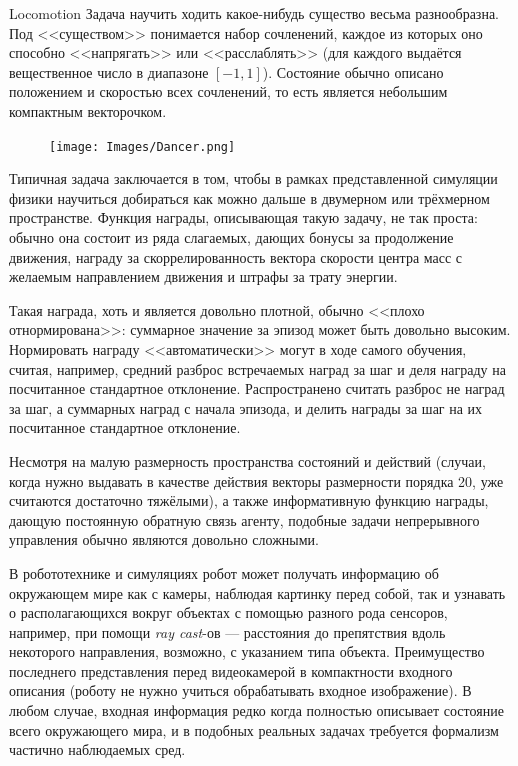 \begin{exampleBox}[label=ex:locomotion]{Locomotion}
Задача научить ходить какое-нибудь существо весьма разнообразна. Под <<существом>> понимается набор сочленений, каждое из которых оно способно <<напрягать>> или <<расслаблять>> (для каждого выдаётся вещественное число в диапазоне $[-1, 1]$). Состояние обычно описано положением и скоростью всех сочленений, то есть является небольшим компактным векторочком. 

\begin{figure}
\centering
\vspace{-0.3cm}
\texttt{[image: Images/Dancer.png]}
\vspace{-0.8cm}
\end{figure}

Типичная задача заключается в том, чтобы в рамках представленной симуляции физики научиться добираться как можно дальше в двумерном или трёхмерном пространстве. Функция награды, описывающая такую задачу, не так проста: обычно она состоит из ряда слагаемых, дающих бонусы за продолжение движения, награду за скоррелированность вектора скорости центра масс с желаемым направлением движения и штрафы за трату энергии.

\begin{remark}
Такая награда, хоть и является довольно плотной, обычно <<плохо отнормирована>>: суммарное значение за эпизод может быть довольно высоким. Нормировать награду <<автоматически>> могут в ходе самого обучения, считая, например, средний разброс встречаемых наград за шаг и деля награду на посчитанное стандартное отклонение. Распространено считать разброс не наград за шаг, а суммарных наград с начала эпизода, и делить награды за шаг на их посчитанное стандартное отклонение.
\end{remark}

Несмотря на малую размерность пространства состояний и действий (случаи, когда нужно выдавать в качестве действия векторы размерности порядка 20, уже считаются достаточно тяжёлыми), а также информативную функцию награды, дающую постоянную обратную связь агенту, подобные задачи непрерывного управления обычно являются довольно сложными.
\end{exampleBox}

\begin{example}
В робототехнике и симуляциях робот может получать информацию об окружающем мире как с камеры, наблюдая картинку перед собой, так и узнавать о располагающихся вокруг объектах с помощью разного рода сенсоров, например, при помощи \emph{ray cast}-ов --- расстояния до препятствия вдоль некоторого направления, возможно, с указанием типа объекта. Преимущество последнего представления перед видеокамерой в компактности входного описания (роботу не нужно учиться обрабатывать входное изображение). В любом случае, входная информация редко когда полностью описывает состояние всего окружающего мира, и в подобных реальных задачах требуется формализм частично наблюдаемых сред. 
\end{example}